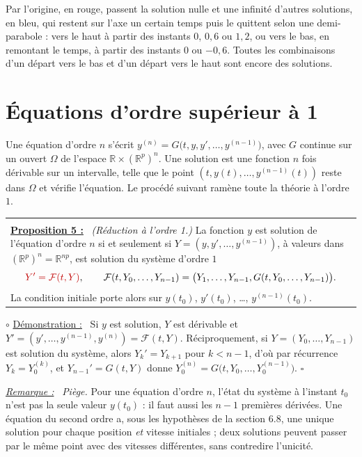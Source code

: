 \documentclass[a4paper,twoside]{report}
\makeatletter
\newcommand{\rmath}[1]{\textcolor{rougecours}{#1}}
\newenvironment{cadre}%
 {\par\vspace{2mm}\noindent\begin{tabular}{|@{\hspace{4mm}}p{0.93\textwidth}@{\hspace{4mm}}|}
  \hline \\[-2mm]}%
 {\\[2mm] \hline \end{tabular}\par\vspace{3mm}}
\newcommand{\propo}[1]{\textbf{\underline{Proposition #1 :}}~}
\newenvironment{demo}%
 {\par\needspace{4\baselineskip}\vspace{1mm}\noindent$\circ$ \underline{Démonstration :}~\setlength{\parskip}{3pt plus 1pt}}%
 {\hfill$\square$\par\vspace{2mm}}
\newenvironment{remarque}%
 {\par\needspace{6\baselineskip}\vspace{1mm}\begin{list}{}{\leftmargin=1cm \rightmargin=0.5cm}\item[]%
  \textit{\underline{Remarque :}}~}%
 {\end{list}\vspace{1mm}}
\newcommand{\R}{\mathbb{R}}
\makeatother
\begin{document}
\noindent Par l'origine, en rouge, passent la solution nulle et une infinité d'autres solutions, en bleu, qui restent sur l'axe un certain temps puis le quittent selon une demi-parabole : vers le haut à partir des instants $0$, $0{,}6$ ou $1{,}2$, ou vers le bas, en remontant le temps, à partir des instants $0$ ou $-0{,}6$. Toutes les combinaisons d'un départ vers le bas et d'un départ vers le haut sont encore des solutions.
\section[Ordre supérieur à 1]{Équations d'ordre supérieur à 1}

Une équation d'ordre $n$ s'écrit $y^{(n)} = G\big(t, y, y', \dots, y^{(n - 1)}\big)$, avec $G$ continue sur un ouvert $\Omega$ de l'espace $\R \times (\R^{p})^{n}$. Une solution est une fonction $n$ fois dérivable sur un intervalle, telle que le point $(t, y(t), \dots, y^{(n - 1)}(t))$ reste dans $\Omega$ et vérifie l'équation. Le procédé suivant ramène toute la théorie à l'ordre $1$.

\begin{cadre}
\propo{5} \emph{(Réduction à l'ordre 1.)} La fonction $y$ est solution de l'équation d'ordre $n$ si et seulement si $Y = (y, y', \dots, y^{(n - 1)})$, à valeurs dans $(\R^{p})^{n} = \R^{np}$, est solution du système d'ordre $1$
\[ \rmath{Y' = \mathcal{F}(t, Y)}, \qquad \mathcal{F}(t, Y_{0}, \dots, Y_{n - 1}) = \big(Y_{1}, \dots, Y_{n - 1}, G(t, Y_{0}, \dots, Y_{n - 1})\big). \]
La condition initiale porte alors sur $y(t_{0})$, $y'(t_{0})$, \dots, $y^{(n - 1)}(t_{0})$.
\end{cadre}

\begin{demo}
Si $y$ est solution, $Y$ est dérivable et $Y' = (y', \dots, y^{(n - 1)}, y^{(n)}) = \mathcal{F}(t, Y)$. Réciproquement, si $Y = (Y_{0}, \dots, Y_{n - 1})$ est solution du système, alors $Y_{k}' = Y_{k + 1}$ pour $k < n - 1$, d'où par récurrence $Y_{k} = Y_{0}^{(k)}$, et $Y_{n - 1}' = G(t, Y)$ donne $Y_{0}^{(n)} = G\big(t, Y_{0}, \dots, Y_{0}^{(n - 1)}\big)$.
\end{demo}

\begin{remarque}
\emph{Piège.} Pour une équation d'ordre $n$, l'état du système à l'instant $t_{0}$ n'est pas la seule valeur $y(t_{0})$ : il faut aussi les $n - 1$ premières dérivées. Une équation du second ordre a, sous les hypothèses de la section 6.8, une unique solution pour chaque position \emph{et} vitesse initiales ; deux solutions peuvent passer par le même point avec des vitesses différentes, sans contredire l'unicité.
\end{remarque}
\end{document}
